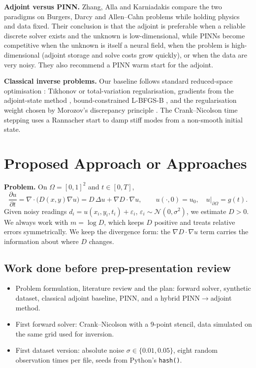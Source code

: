 \documentclass[twoside,english]{article}
\begin{document}
\textbf{Adjoint versus PINN.} Zhang, Alla and Karniadakis \citep{zhang2026} compare the two paradigms on Burgers, Darcy and Allen--Cahn problems while holding physics and data fixed. Their conclusion is that the adjoint is preferable when a reliable discrete solver exists and the unknown is low-dimensional, while PINNs become competitive when the unknown is itself a neural field, when the problem is high-dimensional (adjoint storage and solve costs grow quickly), or when the data are very noisy. They also recommend a PINN warm start for the adjoint.

\textbf{Classical inverse problems.} Our baseline follows standard reduced-space optimisation \citep{vogel2002}: Tikhonov or total-variation \citep{rudin1992} regularisation, gradients from the adjoint-state method \citep{plessix2006}, bound-constrained L-BFGS-B \citep{byrd1995}, and the regularisation weight chosen by Morozov's discrepancy principle \citep{morozov1966}. The Crank--Nicolson time stepping uses a Rannacher start \citep{rannacher1984} to damp stiff modes from a non-smooth initial state.

\section{Proposed Approach or Approaches} \label{sec:our_proj}

\textbf{Problem.} On $\Omega=[0,1]^2$ and $t\in[0,T]$,
\begin{equation}
\frac{\partial u}{\partial t}=\nabla\cdot\big(D(x,y)\nabla u\big) = D\,\Delta u + \nabla D\cdot\nabla u, \qquad u(\cdot,0)=u_0,\quad u|_{\partial\Omega}=g(t). \label{eq:pde}
\end{equation}
Given noisy readings $d_i = u(x_i,y_i,t_i)+\varepsilon_i$, $\varepsilon_i\sim\mathcal N(0,\sigma^2)$, we estimate $D>0$. We always work with $m=\log D$, which keeps $D$ positive and treats relative errors symmetrically. We keep the divergence form: the $\nabla D\cdot\nabla u$ term carries the information about where $D$ changes.

\subsection{Work done before prep-presentation review}

\begin{itemize}
\item Problem formulation, literature review and the plan: forward solver, synthetic dataset, classical adjoint baseline, PINN, and a hybrid PINN$\rightarrow$adjoint method.
\item First forward solver: Crank--Nicolson with a 9-point stencil, data simulated on the same grid used for inversion.
\item First dataset version: absolute noise $\sigma\in\{0.01, 0.05\}$, eight random observation times per file, seeds from Python's \texttt{hash()}.
\end{itemize}
\end{document}
